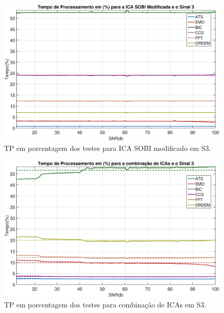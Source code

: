 \documentclass[a4paper,12pt]{monografia}
\theoremstyle{plain}
\theoremstyle{definition}
\theoremstyle{remark}
\begin{document}
\begin{figure}[!htb]
    \begin{center}
    \advance\leftskip -1.5cm
    \includegraphics[scale=0.45]{imagens/ImagensParaOAnexo/TPPRICASOBImodSinal3.eps}
    \caption{TP em porcentagem dos testes para ICA SOBI modificado em S3.}
    \label{fig:TPSMRS3}    
    \end{center}
\end{figure}

\begin{figure}[!htb]
    \begin{center}
    \advance\leftskip -1.5cm
    \includegraphics[scale=0.45]{imagens/ImagensParaOAnexo/TPPRCombinacaoICASinal3.eps}
    \caption{TP em porcentagem dos testes para combinação de ICAs em S3.}
    \label{fig:TPCIRS3}    
    \end{center}
\end{figure}
\end{document}
